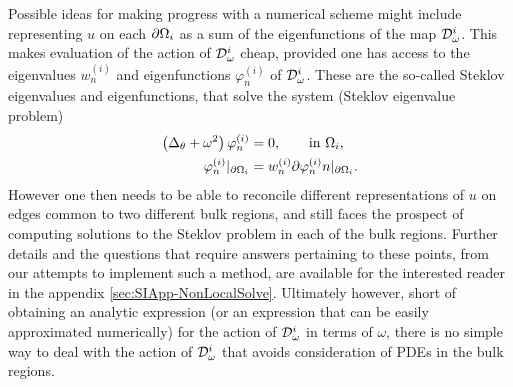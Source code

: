 Possible ideas for making progress with a numerical scheme might include representing $u$ on each $\partial\Omega_i$ as a sum of the eigenfunctions of the map $\mathcal{D}^i_\omega$.
This makes evaluation of the action of $\mathcal{D}^i_\omega$ cheap, provided one has access to the eigenvalues $w^{(i)}_n$ and eigenfunctions $\varphi^{(i)}_n$ of $\mathcal{D}^i_\omega$.
These are the so-called Steklov eigenvalues and eigenfunctions, that solve the system (Steklov eigenvalue problem)
\begin{align*}
	\left( \Delta_\theta + \omega^2 \right)\varphi^{(i)}_n &= 0, \qquad\text{in } \Omega_i, \\
	\varphi^{(i)}_n\vert_{\partial\Omega_i} &= w^{(i)}_n\partial{\varphi^{(i)}_n}{n}\vert_{\partial\Omega_i}. 
\end{align*}
However one then needs to be able to reconcile different representations of $u$ on edges common to two different bulk regions, and still faces the prospect of computing solutions to the Steklov problem in each of the bulk regions.
Further details and the questions that require answers pertaining to these points, from our attempts to implement such a method, are available for the interested reader in the appendix \ref{sec:SIApp-NonLocalSolve}.
Ultimately however, short of obtaining an analytic expression (or an expression that can be easily approximated numerically) for the action of $\mathcal{D}^i_{\omega}$ in terms of $\omega$, there is no simple way to deal with the action of $\mathcal{D}^i_{\omega}$ that avoids consideration of PDEs in the bulk regions.


